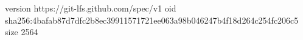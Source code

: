 version https://git-lfs.github.com/spec/v1
oid sha256:4bafab87d7dfc2b8ec39911571721ee063a98b046247b4f18d264c254fc206c5
size 2564
